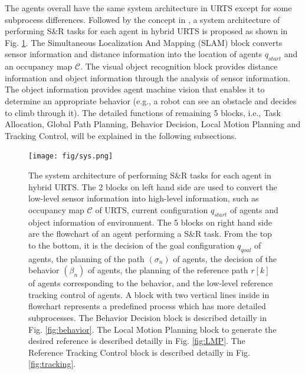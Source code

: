 \documentclass[journal,12pt,onecolumn,draftclsnofoot,]{IEEEtran}
\begin{document}
The agents overall have the same system architecture in URTS except for some subprocess differences. Followed by the concept in \cite{paden2016survey}, a system architecture of performing S\&R tasks for each agent in hybrid URTS is proposed as shown in Fig. \ref{fig:sys}. The Simultaneous Localization And Mapping (SLAM) block converts sensor information and distance information into the location of agents $q_{start}$ and an occupancy map $\mathcal{C}$. The visual object recognition block provides distance information and object information through the analysis of sensor information. The object information provides agent machine vision that enables it to determine an appropriate behavior (e.g., a robot can see an obstacle and decides to climb through it). The detailed functions of remaining 5 blocks, i.e., Task Allocation, Global Path Planning, Behavior Decision, Local Motion Planning and Tracking Control, will be explained in the following subsections.


\begin{figure}[htbp]
    \centering
    \texttt{[image: fig/sys.png]}\caption{The system architecture of performing S\&R tasks for each agent in hybrid URTS. The 2 blocks on left hand side are used to convert the low-level sensor information into high-level information, such as occupancy map $\mathcal{C}$ of URTS, current configuration $q_{start}$ of agents and object information of environment. The 5 blocks on right hand side are the flowchart of an agent performing a S\&R task. From the top to the bottom, it is the decision of the goal configuration $q_{qoal}$ of agents, the planning of the path $(\sigma_n)$ of agents, the decision of the behavior $(\beta_n)$ of agents, the planning of the reference path $r[k]$ of agents corresponding to the behavior, and the low-level reference tracking control of agents. A block with two vertical lines inside in flowchart represents a predefined process which has more detailed subprocesses. The Behavior Decision block is described detailly in Fig. \ref{fig:behavior}. The Local Motion Planning block to generate the desired reference is described detailly in Fig. \ref{fig:LMP}. The Reference Tracking Control block is described detailly in Fig. \ref{fig:tracking}.}
    \label{fig:sys}
\end{figure}
\end{document}
